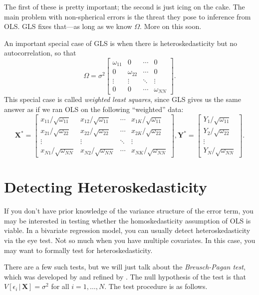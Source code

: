 \documentclass[12pt,oneside,openany]{book}
\begin{document}
The first of these is pretty important; the second is just icing on the
cake. The main problem with non-spherical errors is the threat they pose
to inference from OLS. GLS fixes that---as long as we know \(\Omega\).
More on this soon.

An important special case of GLS is when there is heteroskedasticity but
no autocorrelation, so that \[
\Omega = \sigma^2 \begin{bmatrix}
  \omega_{11} & 0 & \cdots & 0 \\
  0 & \omega_{22} & \cdots & 0 \\
  \vdots & \vdots & \ddots & \vdots \\
  0 & 0 & \cdots & \omega_{NN}
\end{bmatrix}.
\] This special case is called \emph{weighted least squares}, since GLS
gives us the same answer as if we ran OLS on the following ``weighted''
data: \[
\mathbf{X}^* = \begin{bmatrix}
  x_{11} / \sqrt{\omega_{11}} & x_{12} / \sqrt{\omega_{11}} & \cdots & x_{1K} / \sqrt{\omega_{11}} \\
  x_{21} / \sqrt{\omega_{22}} & x_{22} / \sqrt{\omega_{22}} & \cdots & x_{2K} / \sqrt{\omega_{22}} \\
  \vdots & \vdots & \ddots & \vdots \\
  x_{N1} / \sqrt{\omega_{NN}} & x_{N2} / \sqrt{\omega_{NN}} & \cdots & x_{NK} / \sqrt{\omega_{NN}}
\end{bmatrix},
\mathbf{Y}^* = \begin{bmatrix}
  Y_1 / \sqrt{\omega_{11}} \\
  Y_2 / \sqrt{\omega_{22}} \\
  \vdots \\
  Y_N / \sqrt{\omega_{NN}}
\end{bmatrix}.
\]

\section{Detecting
Heteroskedasticity}\label{detecting-heteroskedasticity}

If you don't have prior knowledge of the variance structure of the error
term, you may be interested in testing whether the homoskedasticity
assumption of OLS is viable. In a bivariate regression model, you can
usually detect heteroskedasticity via the eye test. Not so much when you
have multiple covariates. In this case, you may want to formally test
for heteroskedasticity.

There are a few such tests, but we will just talk about the
\emph{Breusch-Pagan test}, which was developed by
\citet{breusch1980lagrange} and refined by \citet{koenker1982robust}.
The null hypothesis of the test is that
\(V[\epsilon_i \,|\, \mathbf{X}] = \sigma^2\) for all
\(i = 1, \ldots, N\). The test procedure is as follows.
\end{document}
